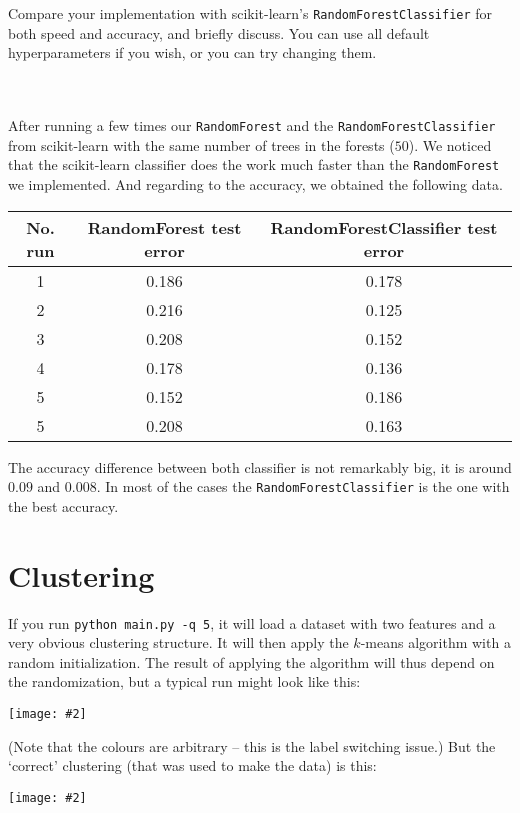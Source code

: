 \documentclass{article}
\def\ans#1{{\color{ans}#1}}
\newcommand{\centerfig}[2]{\begin{center}\texttt{[image: \#2]}\end{center}}
\begin{document}
{{{}
\item Compare your implementation with scikit-learn's \texttt{RandomForestClassifier} for both speed and accuracy, and briefly discuss. You can use all default hyperparameters if you wish, or you can try changing them. \\ \\ \\
\ans{
   After running a few times our \texttt{RandomForest} and the \texttt{RandomForestClassifier}
   from scikit-learn with the same number of trees in the forests ($50$). We noticed that the 
   scikit-learn classifier does the work much faster than the \texttt{RandomForest} we implemented. 
   And regarding to the accuracy, we obtained the following data. \\ 
   \scriptsize
   \setlength{\tabcolsep}{10pt}
   \begin{center}
   \begin{tabular}{SSS} \toprule
      {No. run} & {RandomForest test error} & {RandomForestClassifier test error} \\ \midrule
      {1} & 0.186 & 0.178 \\ 
      {2} & 0.216 & 0.125 \\ 
      {3} & 0.208 & 0.152 \\ 
      {4} & 0.178 & 0.136 \\ 
      {5} & 0.152 & 0.186 \\ 
      {5} & 0.208 & 0.163 \\ \bottomrule
   \end{tabular}
   \end{center}
   \normalsize
   The accuracy difference between both classifier is not remarkably big, it is around $0.09$ and $0.008$. In 
   most of the cases the \texttt{RandomForestClassifier} is the one with the best accuracy.
}
}
}

\section{Clustering}

If you run \verb|python main.py -q 5|, it will load a dataset with two features
and a very obvious clustering structure. It will then apply the $k$-means algorithm
with a random initialization. The result of applying the
algorithm will thus depend on the randomization, but a typical run might look like this:
\centerfig{.5}{../figs/kmeans_basic.png}
(Note that the colours are arbitrary -- this is the label switching issue.)
But the `correct' clustering (that was used to make the data) is this:
\centerfig{.5}{../figs/kmeans_good.png}
\end{document}
